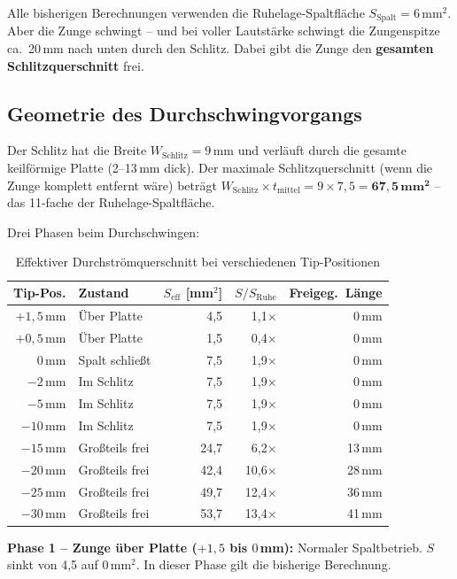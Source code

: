 \documentclass[11pt,a4paper]{article}
\begin{document}
Alle bisherigen Berechnungen verwenden die Ruhelage-Spaltfläche $S_\text{Spalt} = 6\,\text{mm}^2$. Aber die Zunge schwingt -- und bei voller Lautstärke schwingt die Zungenspitze ca.\ 20\,mm nach unten durch den Schlitz. Dabei gibt die Zunge den \textbf{gesamten Schlitzquerschnitt} frei.

\subsection{Geometrie des Durchschwingvorgangs}

Der Schlitz hat die Breite $W_\text{Schlitz} = 9$\,mm und verläuft durch die gesamte keilförmige Platte (2--13\,mm dick). Der maximale Schlitzquerschnitt (wenn die Zunge komplett entfernt wäre) beträgt $W_\text{Schlitz} \times t_\text{mittel} = 9 \times 7{,}5 = \mathbf{67{,}5\,\text{mm}^2}$ -- das 11-fache der Ruhelage-Spaltfläche.

Drei Phasen beim Durchschwingen:

\begin{table}[H]
\centering\small
\begin{tabular}{r l r r r}
\toprule
\textbf{Tip-Pos.} & \textbf{Zustand} & $S_\text{eff}$ [mm$^2$] & $S/S_\text{Ruhe}$ & \textbf{Freigeg.\ Länge} \\
\midrule
$+1{,}5$\,mm & Über Platte & 4{,}5 & 1{,}1$\times$ & 0\,mm \\
$+0{,}5$\,mm & Über Platte & 1{,}5 & 0{,}4$\times$ & 0\,mm \\
$0$\,mm & Spalt schließt & 7{,}5 & 1{,}9$\times$ & 0\,mm \\
$-2$\,mm & Im Schlitz & 7{,}5 & 1{,}9$\times$ & 0\,mm \\
$-5$\,mm & Im Schlitz & 7{,}5 & 1{,}9$\times$ & 0\,mm \\
$-10$\,mm & Im Schlitz & 7{,}5 & 1{,}9$\times$ & 0\,mm \\
$-15$\,mm & Großteils frei & 24{,}7 & 6{,}2$\times$ & 13\,mm \\
$-20$\,mm & Großteils frei & 42{,}4 & 10{,}6$\times$ & 28\,mm \\
$-25$\,mm & Großteils frei & 49{,}7 & 12{,}4$\times$ & 36\,mm \\
$-30$\,mm & Großteils frei & 53{,}7 & 13{,}4$\times$ & 41\,mm \\
\bottomrule
\end{tabular}
\caption{Effektiver Durchströmquerschnitt bei verschiedenen Tip-Positionen}
\end{table}

\textbf{Phase 1 -- Zunge über Platte ($+1{,}5$ bis $0$\,mm):} Normaler Spaltbetrieb. $S$ sinkt von 4{,}5 auf 0\,mm$^2$. In dieser Phase gilt die bisherige Berechnung.
\end{document}
